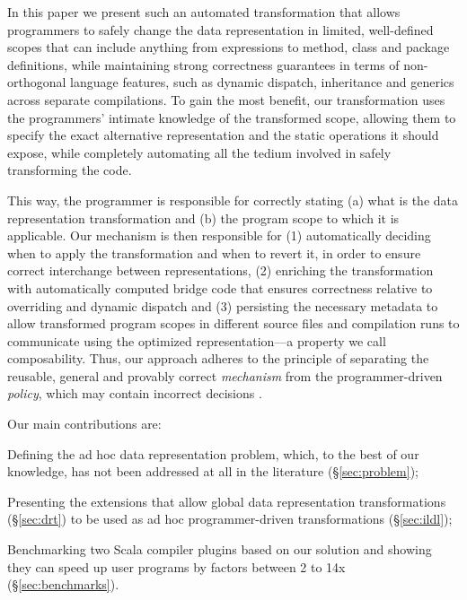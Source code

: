 In this paper we present such an automated transformation that allows
programmers to safely change the data representation in limited,
well-defined scopes that can include anything from expressions to
method, class and package definitions, while maintaining strong
correctness guarantees in terms of non-orthogonal language features,
such as dynamic dispatch, inheritance and generics across separate
compilations.
To gain the most benefit, our transformation uses the programmers'
intimate knowledge of the transformed scope, allowing them to specify
the exact alternative representation and the static operations it
should expose, while completely automating all the tedium involved in
safely transforming the code.

This way, the programmer is responsible for correctly stating (a)
what is the data representation transformation and (b) the program
scope to which it is applicable. Our mechanism is then
responsible for (1) automatically deciding when to apply the
transformation and when to revert it, in order to ensure correct
interchange between representations, (2) enriching the transformation
with automatically computed bridge code that ensures correctness
relative to overriding and dynamic dispatch and (3) persisting
the necessary metadata to allow transformed program scopes in
different source files and compilation runs to communicate using
the optimized representation---a property we call composability.
Thus, our approach adheres to the principle of separating the
reusable, general and provably correct \emph{mechanism} from the
programmer-driven \emph{policy}, which may contain incorrect
decisions \cite{lampson-mechanism-policy}.

Our main contributions are:
\begin{compactitem}
  \item Defining the ad hoc data representation problem, which, to the
    best of our knowledge, has not been addressed at all in the
    literature (\S\ref{sec:problem});
  \item Presenting the extensions that allow global data
    representation transformations (\S\ref{sec:drt}) to be used as
    ad hoc programmer-driven transformations (\S\ref{sec:ildl});
  \item Benchmarking two Scala compiler plugins based on our solution
    and showing they can speed up user programs by factors between 2
    to 14x (\S\ref{sec:benchmarks}).
\end{compactitem}

